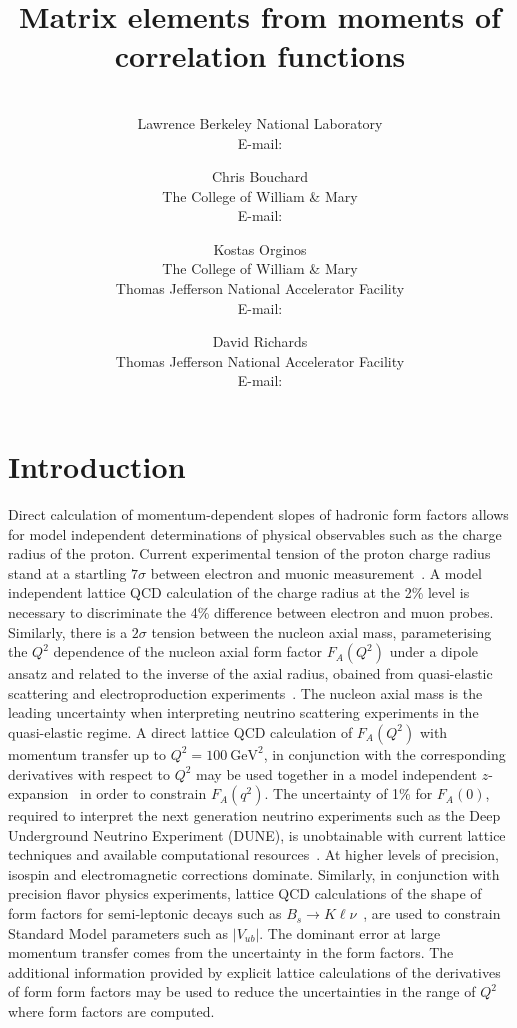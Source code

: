 \documentclass{PoS}
\title{Matrix elements from moments of correlation functions}
\author{\speaker{Chia Cheng Chang}\\
        Lawrence Berkeley National Laboratory\\
        E-mail: \email{chiachang@lbl.gov}}
\author{Chris Bouchard\\
                The College of William \& Mary\\
                E-mail: \email{cmbouchard@wm.edu}}
\author{Kostas Orginos\\
                The College of William \& Mary \\
Thomas Jefferson National Accelerator Facility\\
E-mail: \email{kostas@wm.edu}}
\author{David Richards\\
Thomas Jefferson National Accelerator Facility\\
E-mail: \email{dgr@jlab.org}}
\begin{document}
\section{Introduction}
Direct calculation of momentum-dependent slopes of hadronic form factors allows for model independent determinations of physical observables such as the charge radius of the proton.  Current experimental tension of the proton charge radius stand at a startling $7\sigma$ between electron and muonic measurement~\cite{Carlson:2015jba}. A model independent lattice QCD calculation of the charge radius at the 2\% level is necessary to discriminate the 4\% difference between electron and muon probes. Similarly, there is a $2\sigma$ tension between the nucleon axial mass, parameterising the $Q^2$ dependence of the nucleon axial form factor $F_A(Q^2)$ under a dipole ansatz and related to the inverse of the axial radius, obained from quasi-elastic scattering and electroproduction experiments~\cite{Anikin:2016teg}. The nucleon axial mass is the leading uncertainty when interpreting neutrino scattering experiments in the quasi-elastic regime. A direct lattice QCD calculation of $F_A(Q^2)$ with momentum transfer up to $Q^2=100~\text{GeV}^2$, in conjunction with the corresponding  derivatives with respect to $Q^2$  may be used together in a model independent $z$-expansion~\cite{Bhattacharya:2011ah} in order to constrain $F_A(q^2)$.  The uncertainty of 1\% for $F_A(0)$, required to interpret the next generation neutrino experiments such as the Deep Underground Neutrino Experiment (DUNE), is unobtainable with current lattice techniques and  available computational resources~\cite{Bhattacharya:2016zcn}. At higher levels of precision, isospin and electromagnetic corrections dominate. Similarly, in conjunction with precision flavor physics experiments, lattice QCD calculations of the shape of form factors for semi-leptonic decays such as $B_s\rightarrow K \ell \nu$~\cite{Bouchard:2014ypa}, are used to constrain Standard Model parameters such as $|V_{ub}|$. The dominant error at large momentum transfer comes from the uncertainty in the form factors. The additional information provided by explicit lattice calculations of the derivatives of form form factors may be used to reduce the uncertainties in the range of  $Q^2$ where form factors are computed.
\end{document}
